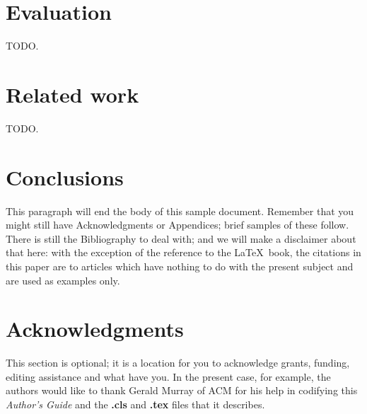 \documentclass{vldb}
\begin{document}
\section{Evaluation}

TODO.

\section{Related work}

TODO.

\section{Conclusions}
This paragraph will end the body of this sample document.
Remember that you might still have Acknowledgments or
Appendices; brief samples of these
follow.  There is still the Bibliography to deal with; and
we will make a disclaimer about that here: with the exception
of the reference to the \LaTeX\ book, the citations in
this paper are to articles which have nothing to
do with the present subject and are used as
examples only.

\balance

\section{Acknowledgments}
This section is optional; it is a location for you
to acknowledge grants, funding, editing assistance and
what have you.  In the present case, for example, the
authors would like to thank Gerald Murray of ACM for
his help in codifying this \textit{Author's Guide}
and the \textbf{.cls} and \textbf{.tex} files that it describes.




\end{document}

